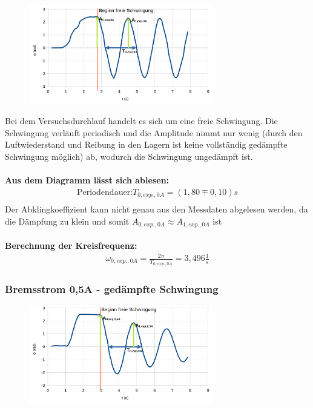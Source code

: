 \documentclass[a4paper]{scrartcl}
\numberwithin{equation}{subsection}
\begin{document}
\begin{figure}[H]
\includegraphics[width=8cm]{Messung_Rad_graph_0A}
\centering
\end{figure}

Bei dem Versuchsdurchlauf handelt es sich um eine freie Schwingung. Die Schwingung verläuft periodisch und die Amplitude nimmt nur wenig (durch den Luftwiederstand und Reibung in den Lagern ist keine vollständig gedämpfte Schwingung möglich) ab, wodurch die Schwingung ungedämpft ist.
\\ \\
\textbf{Aus dem Diagramm lässt sich ablesen:}
\begin{align*}
\text{Periodendauer:} T_{0,\textit{exp.},0A} = (1,80\mp0,10)s \\
\end{align*}
Der Abklingkoeffizient kann nicht genau aus den Messdaten abgelesen werden, da die Dämpfung zu klein und somit $A_{0,\textit{exp.},0A} \approx A_{1,\textit{exp.},0A}$ ist
\\ \\
\textbf{Berechnung der Kreisfrequenz:}
\begin{align}
\omega_{0,\textit{exp.},0A} = \frac{2\pi}{T_{0,\textit{exp.},0A}} = 3,496 \frac{1}{s}
\end{align}

\subsubsection{Bremsstrom 0,5A - gedämpfte Schwingung}

\begin{figure}[H]
\includegraphics[width=8cm]{Messung_Rad_graph_05A}
\centering
\end{figure}
\end{document}
